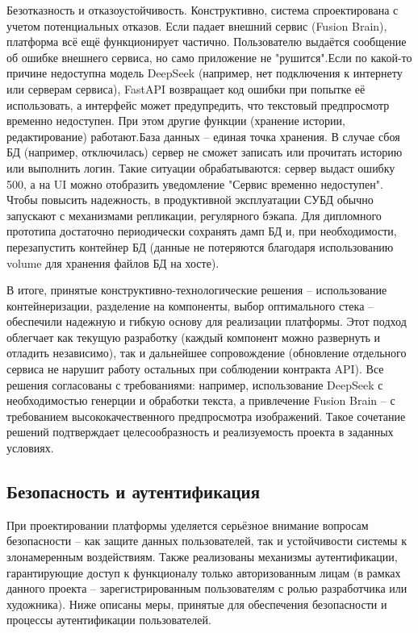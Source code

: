 Безотказность и отказоустойчивость. Конструктивно, система спроектирована с учетом потенциальных отказов. Если падает внешний сервис (Fusion Brain), платформа всё ещё функционирует частично. Пользователю выдаётся сообщение об ошибке внешнего сервиса, но само приложение не "рушится".Если по какой-то причине недоступна модель DeepSeek (например, нет подключения к интернету или серверам сервиса), FastAPI возвращает код ошибки при попытке её использовать, а интерфейс может предупредить, что текстовый предпросмотр временно недоступен. При этом другие функции (хранение истории, редактирование) работают.База данных – единая точка хранения. В случае сбоя БД (например, отключилась) сервер не сможет записать или прочитать историю или выполнить логин. Такие ситуации обрабатываются: сервер выдаст ошибку 500, а на UI можно отобразить уведомление "Сервис временно недоступен". Чтобы повысить надежность, в продуктивной эксплуатации СУБД обычно запускают с механизмами репликации, регулярного бэкапа. Для дипломного прототипа достаточно периодически сохранять дамп БД и, при необходимости, перезапустить контейнер БД (данные не потеряются благодаря использованию volume для хранения файлов БД на хосте).

В итоге, принятые конструктивно-технологические решения – использование контейнеризации, разделение на компоненты, выбор оптимального стека – обеспечили надежную и гибкую основу для реализации платформы. Этот подход облегчает как текущую разработку (каждый компонент можно развернуть и отладить независимо), так и дальнейшее сопровождение (обновление отдельного сервиса не нарушит работу остальных при соблюдении контракта API). Все решения согласованы с требованиями: например, использование DeepSeek с необходимостью генерции и обработки текста, а привлечение Fusion Brain – с требованием высококачественного предпросмотра изображений. Такое сочетание решений подтверждает целесообразность и реализуемость проекта в заданных условиях.

\subsection{Безопасность и аутентификация}

При проектировании платформы уделяется серьёзное внимание вопросам безопасности – как защите данных пользователей, так и устойчивости системы к злонамеренным воздействиям. Также реализованы механизмы аутентификации, гарантирующие доступ к функционалу только авторизованным лицам (в рамках данного проекта – зарегистрированным пользователям с ролью разработчика или художника). Ниже описаны меры, принятые для обеспечения безопасности и процессы аутентификации пользователей.


